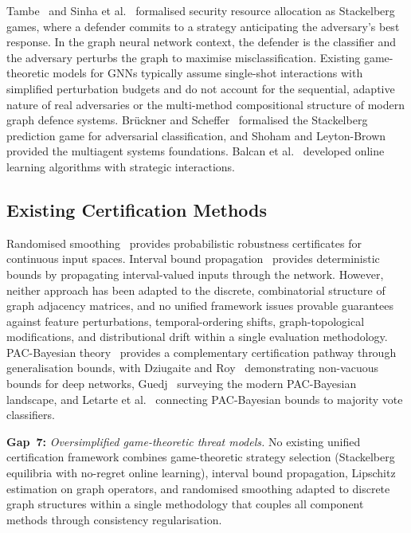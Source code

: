 Tambe~\cite{Tambe2011} and Sinha et al.~\cite{Sinha2018} formalised security resource allocation as Stackelberg games, where a defender commits to a strategy anticipating the adversary's best response. In the graph neural network context, the defender is the classifier and the adversary perturbs the graph to maximise misclassification. Existing game-theoretic models for GNNs typically assume single-shot interactions with simplified perturbation budgets and do not account for the sequential, adaptive nature of real adversaries or the multi-method compositional structure of modern graph defence systems. Br\"{u}ckner and Scheffer~\cite{Bruckner2011} formalised the Stackelberg prediction game for adversarial classification, and Shoham and Leyton-Brown~\cite{Shoham2009} provided the multiagent systems foundations. Balcan et al.~\cite{Balcan2015} developed online learning algorithms with strategic interactions.


\subsection{Existing Certification Methods}

Randomised smoothing~\cite{Cohen2019,Salman2019} provides probabilistic robustness certificates for continuous input spaces. Interval bound propagation~\cite{Gowal2019,Wong2018} provides deterministic bounds by propagating interval-valued inputs through the network. However, neither approach has been adapted to the discrete, combinatorial structure of graph adjacency matrices, and no unified framework issues provable guarantees against feature perturbations, temporal-ordering shifts, graph-topological modifications, and distributional drift within a single evaluation methodology. PAC-Bayesian theory~\cite{McAllester1999,Catoni2007} provides a complementary certification pathway through generalisation bounds, with Dziugaite and Roy~\cite{Dziugaite2017} demonstrating non-vacuous bounds for deep networks, Guedj~\cite{Guedj2019} surveying the modern PAC-Bayesian landscape, and Letarte et al.~\cite{Letarte2019} connecting PAC-Bayesian bounds to majority vote classifiers.

\medskip
\noindent\textbf{Gap~7:} \emph{Oversimplified game-theoretic threat models.} No existing unified certification framework combines game-theoretic strategy selection (Stackelberg equilibria with no-regret online learning), interval bound propagation, Lipschitz estimation on graph operators, and randomised smoothing adapted to discrete graph structures within a single methodology that couples all component methods through consistency regularisation.

